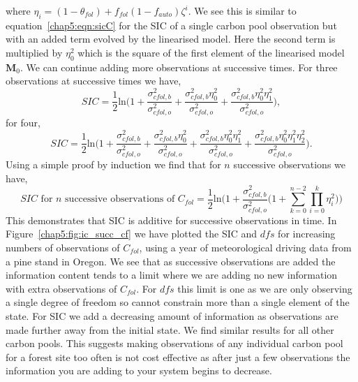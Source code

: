 where $\eta_i=(1-\theta_{fol})+f_{fol}(1-f_{auto})\zeta^{i}$. We see this is similar to equation~\eqref{chap5:eqn:sicC} for the SIC of a single carbon pool observation but with an added term evolved by the linearised model. Here the second term is multiplied by \(\eta_{0}^2\) which is the square of the first element of the linearised model \(\mathbf{M}_0\). We can continue adding more observations at successive times. For three observations at successive times we have,
\begin{equation}
SIC =\frac{1}{2}\text{ln} \bigg(1+\frac{\sigma_{cfol,b}^{2}}{\sigma_{cfol,o}^{2}}+\frac{\sigma_{cfol,b}^{2}\eta_0^{2}}{\sigma_{cfol,o}^{2}}+\frac{\sigma_{cfol,b}^{2}\eta_0^{2}\eta_1^{2}}{\sigma_{cfol,o}^{2}} \bigg),
\end{equation}
for four,
\begin{equation}
SIC =\frac{1}{2}\text{ln} \bigg(1+\frac{\sigma_{cfol,b}^{2}}{\sigma_{cfol,o}^{2}}+\frac{\sigma_{cfol,b}^{2}\eta_0^{2}}{\sigma_{cfol,o}^{2}}+\frac{\sigma_{cfol,b}^{2}\eta_0^{2}\eta_1^{2}}{\sigma_{cfol,o}^{2}}+\frac{\sigma_{cfol,b}^{2}\eta_0^{2}\eta_1^{2}\eta_2^{2}}{\sigma_{cfol,o}^{2}} \bigg).
\end{equation}
Using a simple proof by induction we find that for \(n\) successive observations we have,
\begin{equation}
SIC\text{ for }n\text{ successive observations of }C_{fol} = \frac{1}{2}\text{ln}\bigg(1+\frac{\sigma_{cfol,b}^{2}}{\sigma_{cfol,o}^{2}}\big(1+\sum_{k=0}^{n-2}\prod_{i=0}^{k}\eta_i^{2}\big)\bigg)
\end{equation}
This demonstrates that SIC is additive for successive observations in time. In Figure~\ref{chap5:fig:ic_succ_cf} we have plotted the SIC and \(dfs\) for increasing numbers of observations of \(C_{fol}\), using a year of meteorological driving data from a pine stand in Oregon. We see that as successive observations are added the information content tends to a limit where we are adding no new information with extra observations of \(C_{fol}\). For \(dfs\) this limit is one as we are only observing a single degree of freedom so cannot constrain more than a single element of the state. For SIC we add a decreasing amount of information as observations are made further away from the initial state. We find similar results for all other carbon pools. This suggests making observations of any individual carbon pool for a forest site too often is not cost effective as after just a few observations the information you are adding to your system begins to decrease. 

